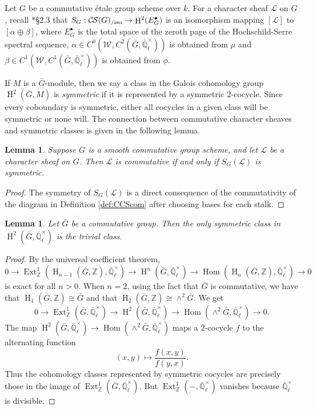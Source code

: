 \documentclass[10pt]{amsart}
\theoremstyle{plain}
\newtheorem{lemma}[theorem]{Lemma}
\theoremstyle{definition}
\newcommand{\ZZ}{{\mathbb{Z}}}
\newcommand{\EE}{\mathbb{\bar Q}_\ell}
\newcommand{\EEx}{\EE^\times}
\newcommand{\Weil}[1]{\mathcal{W}_{#1}}
\DeclareMathOperator{\Hom}{Hom}
\DeclareMathOperator{\Ext}{Ext}
\DeclareMathOperator{\Hh}{H}
\newcommand{\cs}[1]{{\mathcal{#1}}}
\newcommand{\CS}{{\mathcal{C\hskip-0.8pt S}}}
\newcommand{\CSiso}[1]{\CS(#1)_{/\text{iso}}}
\newcommand{\bG}{\bar{G}}
\begin{document}
Let $G$ be a commutative \'etale group scheme over $k$. For a character sheaf $\cs{L}$ on $G$, recall
\cite{cunningham-roe:13a}*{\S 2.3} that $S_G : \CSiso{G} \to \Hh^2(E_G^\bullet)$ is an isomorphism mapping
$[\cs{L}]$ to $[\alpha \oplus \beta]$, where $E_G^\bullet$ is the total space of the zeroth page
of the Hochschild-Serre spectral sequence, $\alpha \in C^0(\Weil{}, C^2(\bG, \EEx))$ is obtained from $\mu$ and
$\beta \in C^1(\Weil{}, C^1(\bG, \EEx))$ is obtained from $\phi$.

If $M$ is a $\bG$-module, then we say a class in the Galois cohomology group $\Hh^2(\bG, M)$
is \emph{symmetric} if it is represented by a symmetric $2$-cocycle.  Since every coboundary is symmetric,
either all cocycles in a given class will be symmetric or none will.  The connection between
commutative character sheaves and symmetric classes is given in the following lemma.
\todo{Define symmetric for element of $\Hh^2(E_G^\bullet)$.}

\begin{lemma} \label{lem:symccslink}
Suppose $G$ is a smooth commutative group scheme, and let $\cs{L}$ be a character sheaf on $G$.
Then $\cs{L}$ is commutative if and only if $S_G(\cs{L})$ is symmetric.
\end{lemma}
\begin{proof}
The symmetry of $S_G(\cs{L})$ is a direct consequence of the commutativity of the diagram in Definition \ref{def:CCScom}
after choosing bases for each stalk.
\end{proof}

\begin{lemma} \label{lem:symtriv}
Let $\bG$ be a commutative group.  Then the only symmetric class in $\Hh^2(\bG, \EEx)$ is the trivial class.
\end{lemma}

\begin{proof}
By the universal coefficient theorem,
\[
0 \to \Ext^1_\ZZ(\Hh_{n-1}(\bG, \ZZ), \EEx) \to \Hh^n(\bG, \EEx) \to \Hom(\Hh_n(\bG, \ZZ), \EEx) \to 0
\]
is exact for all $n > 0$.  When $n = 2$, using the fact that $\bG$ is commutative, we have that $\Hh_1(\bG, \ZZ) \cong \bG$
and that $\Hh_2(\bG, \ZZ) \cong \wedge^2 \bG$. We get
\[
0 \to \Ext^1_\ZZ(\bG, \EEx) \to \Hh^2(\bG, \EEx) \to \Hom(\wedge^2 \bG, \EEx) \to 0.
\]
The map $\Hh^2(\bG, \EEx) \to \Hom(\wedge^2 \bG, \EEx)$ maps a $2$-cocycle $f$ to the alternating function
\[
(x,y) \mapsto \frac{f(x,y)}{f(y,x)}.
\]
Thus the cohomology classes represented by symmetric cocycles are precisely those in the image of $\Ext^1_\ZZ(\bG, \EEx)$.
But $\Ext^1_\ZZ(-, \EEx)$ vanishes because $\EEx$ is divisible.
\end{proof}
\end{document}
